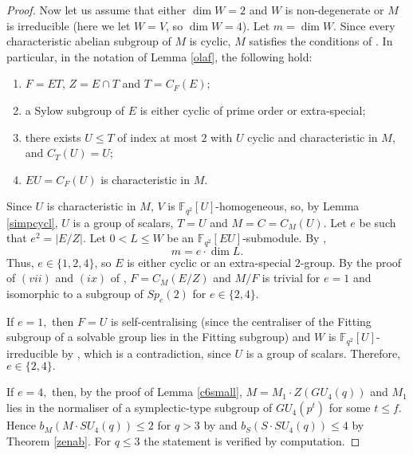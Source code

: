 \begin{proof}
Now let us assume that either  $\dim W=2$ and $W$ is non-degenerate or $M$ is irreducible (here we let $W=V$, so $\dim W=4$). Let $m=\dim W.$  Since every characteristic abelian subgroup of $M$ is cyclic, $M$ satisfies the conditions of \cite[Corollary 1.4]{manz}. In particular, in the notation of Lemma \ref{olaf}, the following hold: 
\begin{enumerate}[font=\normalfont]
\item $F=ET$, $Z=E \cap T$ and $T=C_F(E);$
\item a Sylow subgroup of $E$ is either cyclic of prime order or extra-special;
\item there exists $U \le  T$ of index at most $2$ with $U$ cyclic and characteristic in $M$, and
$C_T(U)=U$;
\item $EU = C_F(U)$ is characteristic in $M$.
\end{enumerate}
Since $U$ is characteristic in $M$, $V$ is $\mathbb{F}_{q^2}[U]$-homogeneous, so, by Lemma \ref{simpcycl}, $U$ is a group of scalars, $T=U$ and $M=C=C_M(U).$ Let $e$ be such that $e^2=|E/Z|.$ Let $0<L \le W$ be an $\mathbb{F}_{q^2}[EU]$-submodule. By \cite[Corollary 2.6]{manz}, $$m=e \cdot \dim L.$$
 Thus, $e \in \{1,2,4\}$, so $E$ is either cyclic or an extra-special $2$-group. By the proof of $(vii)$ and $(ix)$ of \cite[Corollary 1.10]{manz}, 
$F=C_M(E/Z)$ and $M/F$ is trivial for $e=1$ and  isomorphic to a subgroup of $Sp_e(2)$ for $e \in \{2,4\}.$

If $e=1,$ then $F=U$ is self-centralising (since the centraliser of the Fitting subgroup of a solvable group lies in the Fitting subgroup) and $W$ is  $\mathbb{F}_{q^2}[U]$-irreducible by \cite[Lemma 2.2]{manz}, which is a contradiction, since $U$ is a group of scalars. Therefore, $e \in \{2,4\}.$   

If $e=4,$ then, by the proof of Lemma \ref{c6small}, $M=M_1 \cdot Z(GU_4(q))$ and $M_1$ lies in the normaliser of a symplectic-type subgroup of $GU_4(p^t)$ for some $t \le f$. Hence  $b_M(M \cdot SU_4(q)) \le 2$ for $q>3$ by \cite[Table 2]{burness} and $b_S(S \cdot SU_4(q))\le 4$ by Theorem \ref{zenab}. For $q \le 3$ the statement is verified by computation.


\end{proof}
